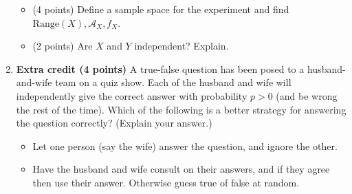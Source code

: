 \documentclass[11pt]{article}
\newcommand{\Range}{{\mathrm{Range}}}
\newcommand{\A}{{\mathcal{A}}}
\begin{document}
\begin{enumerate}
\begin{itemize}
\item (4 points) Define a sample space for the experiment and find $\Range(X), \A_X, f_X$.
\item (2 points) Are $X$ and $Y$ independent?  Explain.
\end{itemize}

\item \textbf{Extra credit (4 points)} A true-false question has been
posed to a husband-and-wife team on a quiz show.  Each of the husband
and wife will independently give the correct answer with probability $p>0$
(and be wrong the rest of the time).
Which of the following is a better strategy for answering the question correctly?  (Explain your answer.)
\begin{itemize}
\item Let one person (say the wife) answer the question, and ignore the other.
\item Have the husband and wife consult on their answers, and if they agree
then use their answer.  Otherwise guess true of false at random.
\end{itemize}
\end{enumerate}
\end{document}
